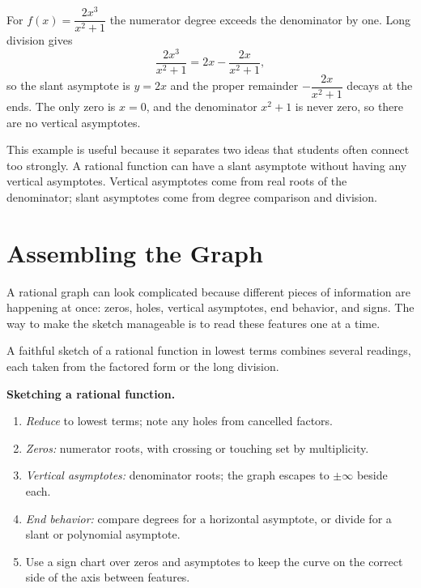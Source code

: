 \documentclass[12pt]{book}
\begin{document}
\begin{example}
For $f(x)=\dfrac{2x^3}{x^2+1}$ the numerator degree exceeds the denominator by one.
Long division gives
\[
\frac{2x^3}{x^2+1}=2x-\frac{2x}{x^2+1},
\]
so the slant asymptote is $y=2x$ and the proper remainder $-\dfrac{2x}{x^2+1}$ decays
at the ends. The only zero is $x=0$, and the denominator $x^2+1$ is never zero, so
there are no vertical asymptotes.
\end{example}

This example is useful because it separates two ideas that students often connect too
strongly. A rational function can have a slant asymptote without having any vertical
asymptotes. Vertical asymptotes come from real roots of the denominator; slant
asymptotes come from degree comparison and division.

\section{Assembling the Graph}

A rational graph can look complicated because different pieces of information are
happening at once: zeros, holes, vertical asymptotes, end behavior, and signs. The
way to make the sketch manageable is to read these features one at a time.

A faithful sketch of a rational function in lowest terms combines several readings,
each taken from the factored form or the long division.

\begin{keyidea}
\textbf{Sketching a rational function.}
\begin{enumerate}\setlength{\itemsep}{2pt}
  \item \emph{Reduce} to lowest terms; note any holes from cancelled factors.
  \item \emph{Zeros:} numerator roots, with crossing or touching set by multiplicity.
  \item \emph{Vertical asymptotes:} denominator roots; the graph escapes to $\pm\infty$
        beside each.
  \item \emph{End behavior:} compare degrees for a horizontal asymptote, or divide for
        a slant or polynomial asymptote.
  \item Use a sign chart over zeros and asymptotes to keep the curve on the correct
        side of the axis between features.
\end{enumerate}
\end{keyidea}
\end{document}
